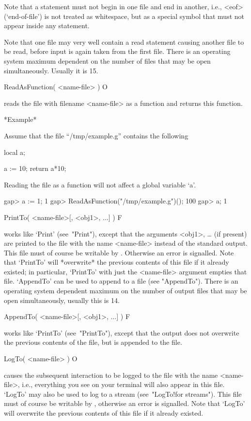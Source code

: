 Note that  a statement must  not begin in one  file  and end  in another,
i.e.,  <eof> (`end-of-file') is not    treated as whitespace,  but as   a
special symbol that must not appear inside any statement.

Note that one file may very well contain a read statement causing another
file to be read, before input is again taken from the  first file.  There
is an operating system maximum dependent on the  number of files that may
be open simultaneously.  Usually it is 15.

\>ReadAsFunction( <name-file> ) O

reads the  file  with filename <name-file> as a function and returns this
function.

*Example*

Assume that the file ``/tmp/example.g'' contains the following

\begintt
local a;

a := 10;
return a*10;
\endtt

Reading the file as a function will not affect a global variable `a'.

\begintt
gap> a := 1;
1
gap> ReadAsFunction("/tmp/example.g")();
100
gap> a;
1
\endtt

\>PrintTo( <name-file>[, <obj1>, ...] ) F

works like `Print'  (see~"Print"),  except  that  the  arguments  <obj1>,
{\dots} (if present) are printed to the file with  the  name  <name-file>
instead of the standard output. This file must of course be  writable  by
{\GAP}. Otherwise  an  error  is  signalled.  Note  that  `PrintTo'  will
*overwrite* the previous contents of this file if it already existed;  in
particular, `PrintTo' with just the  <name-file>  argument  empties  that
file. `AppendTo' can be used to append to a file (see "AppendTo").  There
is an operating system dependent maximum on the number  of  output  files
that may be open simultaneously, usually this is 14.

\>AppendTo( <name-file>[, <obj1>, ...] ) F

works like `PrintTo' (see~"PrintTo"), except that  the  output  does  not
overwrite the previous contents of the file, but is appended to the file.

\>LogTo( <name-file> ) O

causes the subsequent interaction to be logged  to the file with the name
<name-file>, i.e., everything you  see on your  terminal will also appear
in this file. `LogTo' may also be used to log to a stream (see~"LogTo!for
streams").
This file must of course be writable  by {\GAP}, otherwise an error is
signalled.  Note  that   `LogTo'  will overwrite the   previous
contents of this file if it already existed.

